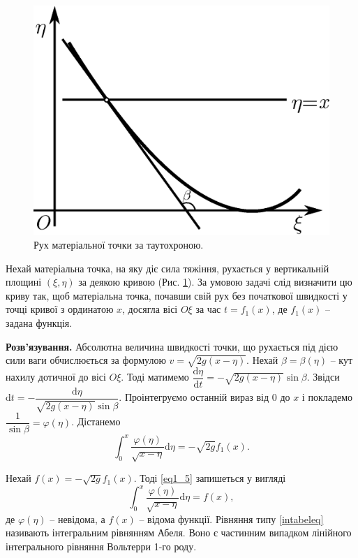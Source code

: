 \documentclass[14pt,twoside]{extreport}
\theoremstyle{mystyle}
\numberwithin{equation}{chapter}
\begin{document}
\begin{figure}[ht]\centering
	\includegraphics[scale=0.5]{abel.eps}
	\caption{Рух матеріальної точки за таутохроною.}\label{figabel}
\end{figure}

Нехай матеріальна точка, на яку діє сила тяжіння, рухається у вертикальній площині $(\xi ,\eta )$ за деякою кривою (Рис. \ref{figabel}). За умовою задачі слід визначити цю криву так, щоб матеріальна точка, почавши свій рух без початкової швидкості у точці кривої з ординатою $x$, досягла вісі $O\xi$ за час $t=f_{1} (x)$, де $f_{1} (x)$ -- задана функція.

\textbf{Розв'язування.} Абсолютна величина швидкості точки, що рухається під дією сили ваги обчислюється за формулою $v=\sqrt{2g(x-\eta )} $. Нехай $\beta =\beta (\eta )$ -- кут нахилу дотичної до вісі $O\xi $. Тоді матимемо $\dfrac{\mathrm{d}\eta} {\mathrm{d}t} =-\sqrt{2g(x-\eta )} \sin \beta$. Звідси $\mathrm{d}t=-\dfrac{\mathrm{d}\eta} {\sqrt{2g(x-\eta )} \sin \beta}$. Проінтегруємо останній вираз від $0$ до $x$ і покладемо $\dfrac{1}{\sin \beta} =\varphi (\eta )$. Дістанемо
\begin{equation} \label{eq1_5}
    \int _{0}^{x} \frac{\varphi (\eta )}{\sqrt{x-\eta} } \mathrm{d}\eta =-\sqrt{2g} f_{1} (x).
\end{equation}

Нехай $f(x)=-\sqrt{2g} f_{1} (x)$. Тоді \eqref{eq1_5} запишеться у вигляді
\begin{equation} \label{intabeleq}
    \int _{0}^{x} \frac{\varphi (\eta )}{\sqrt{x-\eta} } \mathrm{d}\eta =f(x),
\end{equation}
де $\varphi (\eta )$ -- невідома, а $f(x)$ -- відома функції. Рівняння типу \eqref{intabeleq} називають інтегральним рівнянням Абеля. Воно є частинним випадком лінійного інтегрального рівняння Вольтерри 1-го роду.
\end{document}
